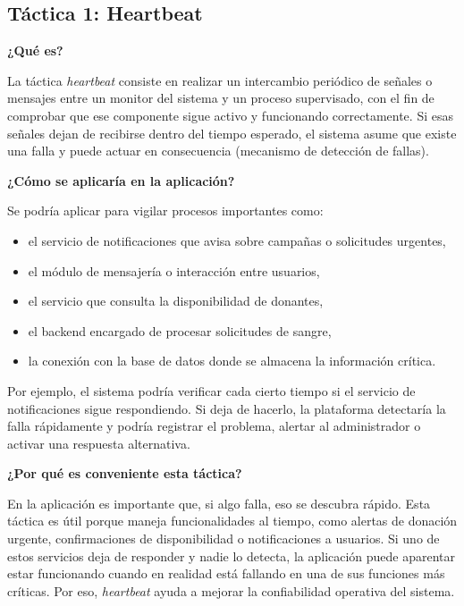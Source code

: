 \subsection{Táctica 1: Heartbeat}

\noindent\textbf{¿Qué es?}

La táctica \textit{heartbeat} consiste en realizar un intercambio periódico de señales o mensajes entre un monitor del sistema y un proceso supervisado, con el fin de comprobar que ese componente sigue activo y funcionando correctamente. Si esas señales dejan de recibirse dentro del tiempo esperado, el sistema asume que existe una falla y puede actuar en consecuencia (mecanismo de detección de fallas).

\medskip
\noindent\textbf{¿Cómo se aplicaría en la aplicación?}

Se podría aplicar para vigilar procesos importantes como:

\begin{itemize}
    \item el servicio de notificaciones que avisa sobre campañas o solicitudes urgentes,
    \item el módulo de mensajería o interacción entre usuarios,
    \item el servicio que consulta la disponibilidad de donantes,
    \item el backend encargado de procesar solicitudes de sangre,
    \item la conexión con la base de datos donde se almacena la información crítica.
\end{itemize}

Por ejemplo, el sistema podría verificar cada cierto tiempo si el servicio de notificaciones sigue respondiendo. Si deja de hacerlo, la plataforma detectaría la falla rápidamente y podría registrar el problema, alertar al administrador o activar una respuesta alternativa.

\medskip
\noindent\textbf{¿Por qué es conveniente esta táctica?}

En la aplicación es importante que, si algo falla, eso se descubra rápido. Esta táctica es útil porque maneja funcionalidades al tiempo, como alertas de donación urgente, confirmaciones de disponibilidad o notificaciones a usuarios. Si uno de estos servicios deja de responder y nadie lo detecta, la aplicación puede aparentar estar funcionando cuando en realidad está fallando en una de sus funciones más críticas. Por eso, \textit{heartbeat} ayuda a mejorar la confiabilidad operativa del sistema.

